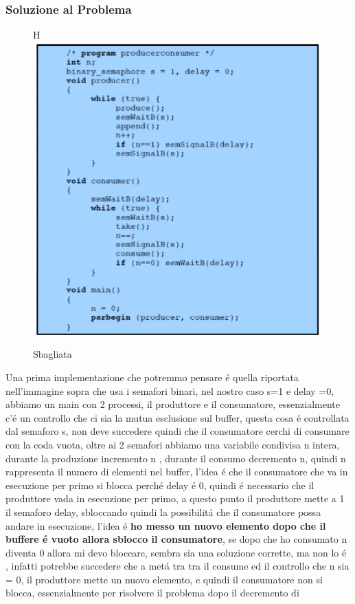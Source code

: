 \subsubsection*{Soluzione al Problema}
\begin{figure}{H}
    \centering
    \includegraphics[width=0.7\linewidth]{immagini/ProduttoreConsumatoreSoluzioneSbagliata}
    \caption{Sbagliata}
\end{figure}
Una prima implementazione che potremmo pensare é quella riportata nell'immagine sopra che usa i
semafori binari, nel nostro caso s=1 e delay =0, abbiamo un main con 2 processi, il produttore e il consumatore, essenzialmente c'é un controllo che
ci sia la mutua esclusione sul buffer, questa cosa é controllata dal semaforo s, non deve succedere quindi che il consumatore cerchi di consumare
con la coda vuota, oltre ai 2 semafori abbiamo una variabile condivisa n intera, durante la produzione incremento n , durante il consumo decremento n,
quindi n rappresenta il numero di elementi nel buffer, l'idea é che il consumatore che va in esecuzione per primo si blocca perché delay é 0,
quindi é necessario che il produttore vada in esecuzione per primo, a questo punto il produttore mette a 1 il semaforo delay, sbloccando quindi
la possibilitá che il consumatore possa andare in esecuzione, l'idea é \textbf{ho messo un nuovo elemento dopo che il buffere é vuoto allora sblocco il consumatore},
se dopo che ho consumato n diventa 0 allora mi devo bloccare, sembra sia una soluzione corrette, ma non lo é , infatti potrebbe succedere che a metá tra
tra il consume ed il controllo che n sia = 0, il produttore mette un nuovo elemento, e quindi il consumatore non si blocca, essenzialmente per risolvere il problema dopo il decremento di
